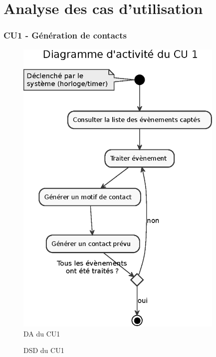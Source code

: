 \part{Analyse des cas d'utilisation}
\setcounter{section}{0}

\section{CU1 - Génération de contacts}

\begin{figure}[H]
\centering
\includegraphics[width=10cm]{figures/eps/DA_CU1.eps}
\caption{DA du CU1}
\end{figure}

\begin{figure}[H]
\noindent{}
\caption{DSD du CU1}
\end{figure}


